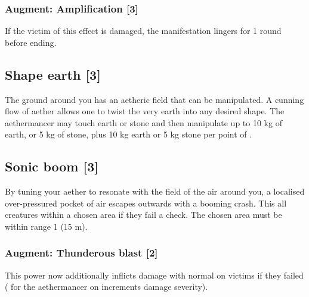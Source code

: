 \subsubsection{Augment: Amplification [3]}
If the victim of this effect is damaged, the manifestation lingers for 1 round before ending.




\subsection{Shape earth [3]}
The ground around you has an aetheric field that can be manipulated. A cunning flow of aether allows one to twist the very earth into any desired shape. The aethermancer may touch earth or stone and then manipulate up to 10 kg of earth, or 5 kg of stone, plus 10 kg earth or 5 kg stone per point of . 


\subsection{Sonic boom [3]}
By tuning your aether to resonate with the field of the air around you, a localised over-pressured pocket of air escapes outwards with a booming crash. This  all creatures within a chosen area if they fail a  check. The chosen area must be within range 1 (15 m).
\subsubsection{Augment: Thunderous blast [2]}
This power now additionally inflicts damage with normal  on victims if they failed  ( for the aethermancer on  increments damage severity).


